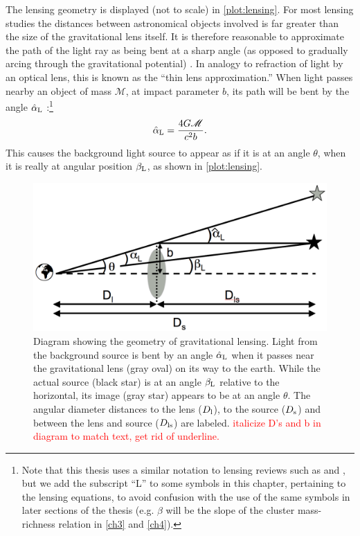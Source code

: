 The lensing geometry is displayed (not to scale) in \autoref{plot:lensing}. For most lensing studies the distances between astronomical objects involved is far greater than the size of the gravitational lens itself. It is therefore reasonable to approximate the path of the light ray as being bent at a sharp angle (as opposed to gradually arcing through the gravitational potential) \citep{BS01}. In analogy to refraction of light by an optical lens, this is known as the ``thin lens approximation.'' When light passes nearby an object of mass ${\mathscr M}$, at impact parameter $b$, its path will be bent by the angle $\hat{\alpha}_{\rm L}$ \citep{RydenText}:\footnote{Note that this thesis uses a similar notation to lensing reviews such as \citet{BS01} and \citet{Schneider06_WeakGravLens}, but we add the subscript ``L'' to some symbols in this chapter, pertaining to the lensing equations, to avoid confusion with the use of the same symbols in later sections of the thesis (e.g. $\beta$ will be the slope of the cluster mass-richness relation in \autoref{ch3} and \autoref{ch4}).}
\begin{equation}
\label{eqn:deflection}
\hat{\alpha}_{\rm L} = \frac{4G{\mathscr M}}{c^2 b}.
\end{equation}
This causes the background light source to appear as if it is at an angle $\theta$, when it is really at angular position $\beta_{\rm L}$, as shown in \autoref{plot:lensing}.

\begin{figure}
\begin{center}
\includegraphics[scale=0.4]{plots_intro/LensDiagram.png}
\caption[Gravitational Lensing Diagram]{Diagram showing the geometry of gravitational lensing. Light from the background source is bent by an angle $\hat{\alpha}_{\rm L}$ when it passes near the gravitational lens (gray oval) on its way to the earth. While the actual source (black star) is at an angle $\beta_{\rm L}$ relative to the horizontal, its image (gray star) appears to be at an angle $\theta$. The angular diameter distances to the lens ($D_{\rm l}$), to the source ($D_{\rm s}$) and between the lens and source ($D_{\rm ls}$) are labeled. \textcolor{red}{italicize D's and b in diagram to match text, get rid of underline.}}
\label{plot:lensing}
\end{center}
\end{figure}

